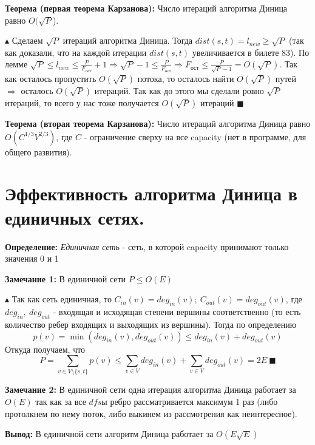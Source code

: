 \par \textbf{Теорема (первая теорема Карзанова):} Число итераций алгоритма Диница равно $O(\sqrt{P}$).
\par $\blacktriangle$ Сделаем $\sqrt{P}$ итераций алгоритма Диница. Тогда $dist(s,t)=l_{new} \geq \sqrt{P}$ (так как доказали, что на каждой итерации $dist(s,t)$ увеличивается в билете 83). По лемме $\sqrt{P} \leq l_{new} \leq \frac{P}{F_{\text{ост}}}+1 \Rightarrow \sqrt{P}-1 \leq \frac{P}{F_{\text{ост}}} \Rightarrow F_{\text{ост}} \leq \frac{P}{\sqrt{P}-1}=O(\sqrt{P})$. Так как осталось пропустить $O(\sqrt{P})$ потока, то осталось найти $O(\sqrt{P})$ путей $\Rightarrow$ осталось $O(\sqrt{P})$ итераций. Так как до этого мы сделали ровно $\sqrt{P}$ итераций, то всего у нас тоже получается $O(\sqrt{P})$ итераций $\blacksquare$
\par \textbf{Теорема (вторая теорема Карзанова):} Число итераций алгоритма Диница равно $O(C^{1/3} V^{2/3})$, где $C$ - ограничение сверху на все capacity (нет в программе, для общего развития).
\\

\setcounter{section}{84}
\section{Эффективность алгоритма  Диница в единичных сетях.}
\par \textbf{Определение:} \textit{Единичная сеть} - сеть, в которой capacity принимают только значения 0 и 1
\par \textbf{Замечание 1:} В единичной сети $P \leq O(E)$
\par $\blacktriangle$ Так как сеть единичная, то $C_{in}(v)=deg_{in}(v); \: C_{out}(v)=deg_{out}(v)$, где $deg_{in}, \: deg_{out}$ - входящая и исходящая степени вершины соответственно (то есть количество ребер входящих и выходящих из вершины). Тогда по определению $$p(v)=\min(deg_{in}(v), deg_{out}(v)) \leq deg_{in}(v) + deg_{out}(v)$$Откуда получаем, что $$P = \sum_{v \in V \setminus \{ s, t\}} p(v) \leq \sum_{v \in V} deg_{in}(v) + \sum_{v \in V} deg_{out}(v) = 2E \: \blacksquare$$
\par \textbf{Замечание 2:} В единичной сети одна итерация алгоритма Диница работает за $O(E)$ так как за все $dfs$ы ребро рассматривается максимум 1 раз (либо протолкнем по нему поток, либо выкинем из рассмотрения как неинтересное).
\par \textbf{Вывод:} В единичной сети алгоритм Диница работает за $O(E\sqrt{E})$